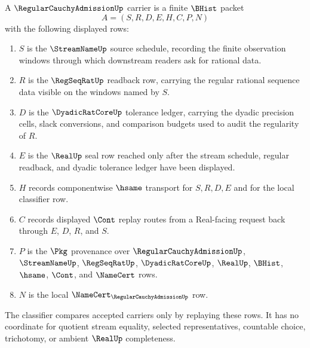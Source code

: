 \begin{definition}
\label{def:regular-cauchy-admission-carrier}
A $\RegularCauchyAdmissionUp$ carrier is a finite $\BHist$ packet
$$
A=(S,R,D,E,H,C,P,N)
$$
with the following displayed rows:
\begin{enumerate}
\item $S$ is the $\StreamNameUp$ source schedule, recording the finite observation windows through which downstream readers ask for rational data.
\item $R$ is the $\RegSeqRatUp$ readback row, carrying the regular rational sequence data visible on the windows named by $S$.
\item $D$ is the $\DyadicRatCoreUp$ tolerance ledger, carrying the dyadic precision cells, slack conversions, and comparison budgets used to audit the regularity of $R$.
\item $E$ is the $\RealUp$ seal row reached only after the stream schedule, regular readback, and dyadic tolerance ledger have been displayed.
\item $H$ records componentwise $\hsame$ transport for $S,R,D,E$ and for the local classifier row.
\item $C$ records displayed $\Cont$ replay routes from a Real-facing request back through $E$, $D$, $R$, and $S$.
\item $P$ is the $\Pkg$ provenance over $\RegularCauchyAdmissionUp$, $\StreamNameUp$, $\RegSeqRatUp$, $\DyadicRatCoreUp$, $\RealUp$, $\BHist$, $\hsame$, $\Cont$, and $\NameCert$ rows.
\item $N$ is the local $\NameCert_{\RegularCauchyAdmissionUp}$ row.
\end{enumerate}
The classifier compares accepted carriers only by replaying these rows. It has no coordinate for quotient stream equality, selected representatives, countable choice, trichotomy, or ambient $\RealUp$ completeness.
\end{definition}

